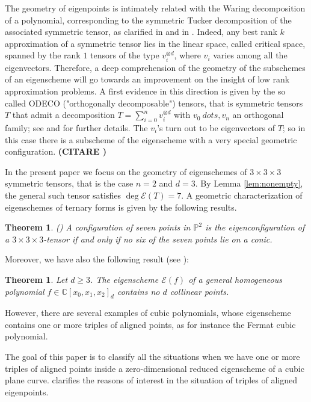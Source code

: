\documentclass{amsart}
\theoremstyle{plain}
\newtheorem{theorem}[lemma]{Theorem}
\theoremstyle{definition}
\newcommand{\C}{\mathbb{C}}
\newcommand{\p}{\mathbb{P}}
\newcommand{\Eig}[1]{\mathcal{E}\!\left( {#1} \right)}
\begin{document}
The geometry of eigenpoints is intimately related with the Waring decomposition of a polynomial,
corresponding to the symmetric Tucker decomposition of the associated symmetric tensor,
as clarified
in \cite{DOT} and in \cite{Ott}. Indeed, any best rank $k$ approximation of a symmetric tensor lies in the linear
space, called {critical space}, spanned by the rank $1$ tensors of the type $v_i ^{\otimes d}$, where $v_i$ varies among all the eigenvectors. Therefore, a deep comprehension of the geometry of the subschemes of an eigenscheme will
go towards an improvement on the insight of low rank approximation problems. A first evidence in this direction is given by the so called ODECO ("orthogonally decomposable") tensors, that is symmetric tensors~$T$ that admit a decomposition
$T= \sum _{i=0}^n v_i ^{\otimes d}$ with $v_0 \ dots , v_n$ an orthogonal family; see \cite{Rob} and \cite{BDHE}
for further details. The $v_i$'s turn out to be eigenvectors of $T$; so in this case there is a subscheme of the eigenscheme with a very special geometric configuration.
\textbf{(CITARE \cite{Ottaviani24})}

 In the present paper we focus on the geometry of eigenschemes of $3\times 3 \times 3$ symmetric tensors, that is the case $n=2$ and $d=3$. By Lemma \ref{lem:nonempty}, the general such tensor
 satisfies $\deg \Eig{T}=7$. A geometric characterization of eigenschemes of ternary forms is given by the following results.

\begin{theorem} (\cite[Theorem 5.1]{ASS})
A configuration of seven points in $\p^2$ is the eigenconfiguration
of a $3\times 3 \times 3$-tensor if and only if no six of the seven points lie on a conic.
\end{theorem}

Moreover, we have also the following result (see \cite[Theorem 5.7]{BGV}):
\begin{theorem}
\label{thm:general_no_d_collinear}
Let $d\ge 3$. The eigenscheme $\Eig{f}$ of a general homogeneous polynomial $f \in \C[x_0,x_1,x_2]_d$ contains no $d$ collinear points.
\end{theorem}

However, there are several examples of cubic polynomials, whose eigenscheme contains one or more triples of aligned points, as for instance the Fermat cubic polynomial.

The goal of this paper is to classify all the situations when we have one or more triples of aligned points inside a zero-dimensional reduced eigenscheme of a cubic plane curve.
 clarifies the reasons of interest in the situation of triples of aligned eigenpoints.
\end{document}
